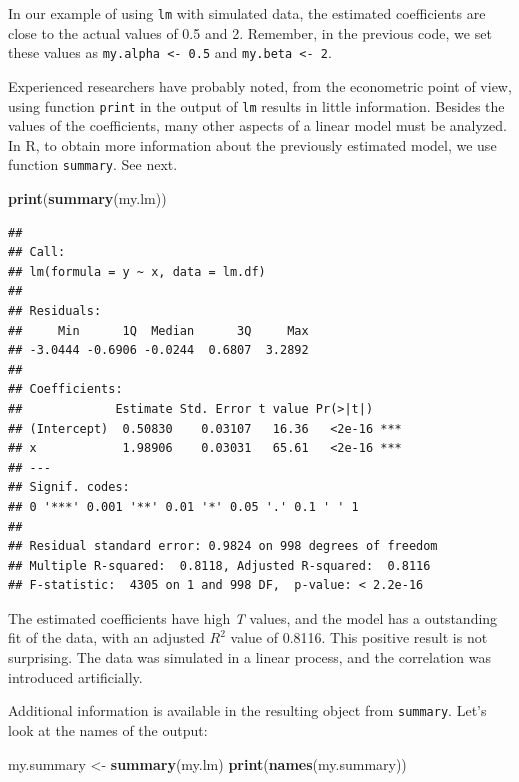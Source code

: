 \documentclass[11pt,]{book}
\newenvironment{Shaded}{\begin{snugshade}}{\end{snugshade}}
\newcommand{\KeywordTok}[1]{\textcolor[rgb]{0.27,0.27,0.27}{\textbf{#1}}}
\newcommand{\StringTok}[1]{\textcolor[rgb]{0.5,0.5,0.5}{#1}}
\newcommand{\NormalTok}[1]{#1}
\begin{document}
In our example of using \texttt{lm} with simulated data, the estimated
coefficients are close to the actual values of 0.5 and 2. Remember, in
the previous code, we set these values as
\texttt{my.alpha\ \textless{}-\ 0.5} and
\texttt{my.beta\ \textless{}-\ 2}.

Experienced researchers have probably noted, from the econometric point
of view, using function \texttt{print} in the output of \texttt{lm}
results in little information. Besides the values of the coefficients,
many other aspects of a linear model must be analyzed. In R, to obtain
more information about the previously estimated model, we use function
\texttt{summary}. See next. 

\begin{Shaded}
\begin{Highlighting}[]
\KeywordTok{print}\NormalTok{(}\KeywordTok{summary}\NormalTok{(my.lm))}
\end{Highlighting}
\end{Shaded}

\begin{verbatim}
## 
## Call:
## lm(formula = y ~ x, data = lm.df)
## 
## Residuals:
##     Min      1Q  Median      3Q     Max 
## -3.0444 -0.6906 -0.0244  0.6807  3.2892 
## 
## Coefficients:
##             Estimate Std. Error t value Pr(>|t|)    
## (Intercept)  0.50830    0.03107   16.36   <2e-16 ***
## x            1.98906    0.03031   65.61   <2e-16 ***
## ---
## Signif. codes:  
## 0 '***' 0.001 '**' 0.01 '*' 0.05 '.' 0.1 ' ' 1
## 
## Residual standard error: 0.9824 on 998 degrees of freedom
## Multiple R-squared:  0.8118, Adjusted R-squared:  0.8116 
## F-statistic:  4305 on 1 and 998 DF,  p-value: < 2.2e-16
\end{verbatim}

The estimated coefficients have high \emph{T} values, and the model has
a outstanding fit of the data, with an adjusted \(R^2\) value of 0.8116.
This positive result is not surprising. The data was simulated in a
linear process, and the correlation was introduced artificially.

Additional information is available in the resulting object from
\texttt{summary}. Let's look at the names of the output:

\begin{Shaded}
\begin{Highlighting}[]
\NormalTok{my.summary <-}\StringTok{ }\KeywordTok{summary}\NormalTok{(my.lm)}
\KeywordTok{print}\NormalTok{(}\KeywordTok{names}\NormalTok{(my.summary))}
\end{Highlighting}
\end{Shaded}
\end{document}
